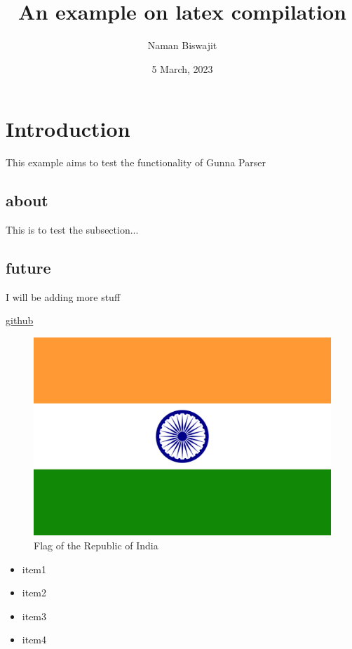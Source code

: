\documentclass{article}
\title{An example on latex compilation}
\author{Naman Biswajit}
\date{5 March, 2023}
\begin{document}
\maketitle




\section{Introduction}
This example aims to test the functionality of Gunna Parser

\subsection{about}
This is to test the subsection...

\subsection{future}
I will be adding more stuff

\href{https://github.com/}{github}

\begin{figure}
\includegraphics[scale=2]{flag.png}
\caption{Flag of the Republic of India}
\centering

\end{figure}


\begin{itemize}

\item  item1
\item  item2
\item  item3
\item  item4
\end{itemize}
\end{document}
